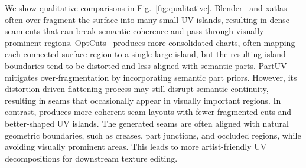 We show qualitative comparisons in Fig.~\ref{fig:qualitative}. 
Blender~\cite{blender} and xatlas~\cite{young2019xatlas} often over-fragment the surface into many small UV islands, resulting in dense seam cuts that can break semantic coherence and pass through visually prominent regions. 
OptCuts~\cite{li2018optcuts} produces more consolidated charts, often mapping each connected surface region to a single large island, but the resulting island boundaries tend to be distorted and less aligned with semantic parts. 
PartUV~\cite{wang2025partuv} mitigates over-fragmentation by incorporating semantic part priors. 
However, its distortion-driven flattening process may still disrupt semantic continuity, resulting in seams that occasionally appear in visually important regions.
%
In contrast, \methodname{} produces more coherent seam layouts with fewer fragmented cuts and better-shaped UV islands. 
The generated seams are often aligned with natural geometric boundaries, such as creases, part junctions, and occluded regions, while avoiding visually prominent areas. 
This leads to more artist-friendly UV decompositions for downstream texture editing.

